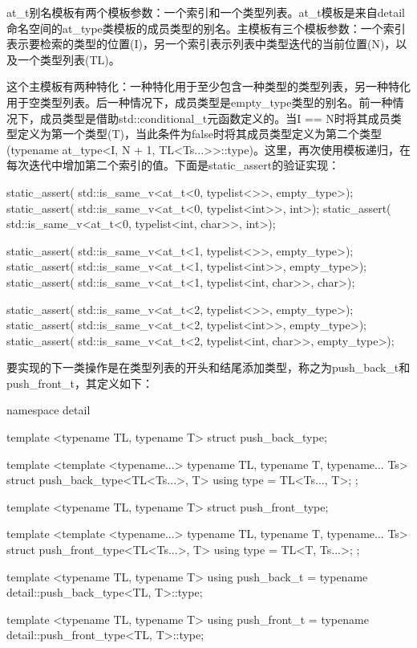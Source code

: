 at_t别名模板有两个模板参数：一个索引和一个类型列表。at_t模板是来自detail命名空间的at_type类模板的成员类型的别名。主模板有三个模板参数：一个索引表示要检索的类型的位置(I)，另一个索引表示列表中类型迭代的当前位置(N)，以及一个类型列表(TL)。

这个主模板有两种特化：一种特化用于至少包含一种类型的类型列表，另一种特化用于空类型列表。后一种情况下，成员类型是empty_type类型的别名。前一种情况下，成员类型是借助std::conditional_t元函数定义的。当I == N时将其成员类型定义为第一个类型(T)，当此条件为false时将其成员类型定义为第二个类型(typename at_type<I, N + 1, TL<Ts...>>::type)。这里，再次使用模板递归，在每次迭代中增加第二个索引的值。下面是static_assert的验证实现：

\begin{cppcode}
static_assert(
	std::is_same_v<at_t<0, typelist<>>, empty_type>);
static_assert(
	std::is_same_v<at_t<0, typelist<int>>, int>);
static_assert(
	std::is_same_v<at_t<0, typelist<int, char>>, int>);
	
static_assert(
	std::is_same_v<at_t<1, typelist<>>, empty_type>);
static_assert(
	std::is_same_v<at_t<1, typelist<int>>, empty_type>);
static_assert(
	std::is_same_v<at_t<1, typelist<int, char>>, char>);
	
static_assert(
	std::is_same_v<at_t<2, typelist<>>, empty_type>);
static_assert(
	std::is_same_v<at_t<2, typelist<int>>, empty_type>);
static_assert(
	std::is_same_v<at_t<2, typelist<int, char>>,
				   empty_type>);
\end{cppcode}

要实现的下一类操作是在类型列表的开头和结尾添加类型，称之为push_back_t和push_front_t，其定义如下：

\begin{cppcode}
namespace detail
{
	template <typename TL, typename T>
	struct push_back_type;
	
	template <template <typename...> typename TL,
			  typename T, typename... Ts>
	struct push_back_type<TL<Ts...>, T>
	{
		using type = TL<Ts..., T>;
	};

	template <typename TL, typename T>
	struct push_front_type;
	
	template <template <typename...> typename TL,
			  typename T, typename... Ts>
	struct push_front_type<TL<Ts...>, T>
	{
		using type = TL<T, Ts...>;
	};
}

template <typename TL, typename T>
using push_back_t =
	typename detail::push_back_type<TL, T>::type;
	
template <typename TL, typename T>
using push_front_t =
	typename detail::push_front_type<TL, T>::type;
\end{cppcode}

